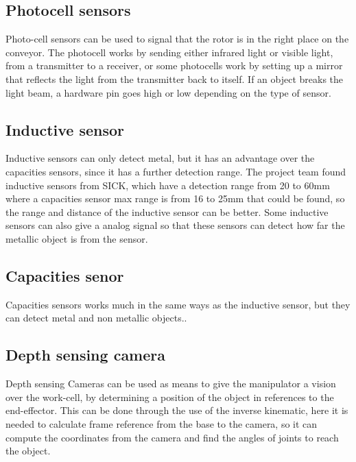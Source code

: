  
  \subsection{Photocell sensors} 
  Photo-cell sensors can be used to signal that the rotor is in the right place on the conveyor. The photocell works by sending either infrared light or visible light, from a transmitter to a receiver, or some photocells work by setting up a mirror that reflects the light from the transmitter back to itself. If an object breaks the light beam, a hardware pin goes high or low depending on the type of sensor\cite{SICKfo}. \\

 \subsection{Inductive sensor}
 Inductive sensors can only detect metal, but it has an advantage over the capacities sensors, since it has a further detection range. The project team found inductive sensors from SICK, which have a detection range from 20 to 60mm \cite{SICKin} where a capacities sensor max range is from 16 to 25mm \cite{SICKka} that could be found, so the range and distance of the inductive sensor can be better. Some inductive sensors can also give a analog signal so that these sensors can detect how far the metallic object is from the sensor\cite{SICKin}.\\ 

 \subsection{Capacities senor} 
 Capacities sensors works much in the same ways as the inductive sensor, but they can detect metal and non metallic objects.\cite{SICKka}.\\

 \subsection{Depth sensing camera} \label{depthcam}
 Depth sensing Cameras can be used as means to give the manipulator a vision over the work-cell, by determining a position of the object in references to the end-effector\cite{cam}. This can be done through the use of the inverse kinematic, here it is needed to calculate frame reference from the base to the camera, so it can compute the coordinates from the camera and find the angles of joints to reach the object\cite{JohnC}.\\
 
